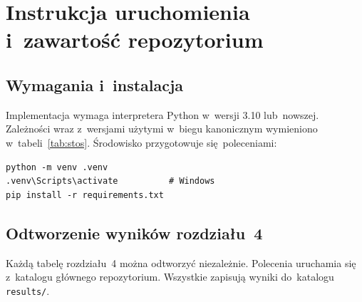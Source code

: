 \documentclass[polish,master,a4paper,oneside]{ppfcmthesis}
\renewcommand{\_}{\origtextunderscore\ifmmode\else\allowbreak\fi}
\begin{document}
{\raggedright\sloppy\small}

\appendix

\chapter{Instrukcja uruchomienia i~zawartość repozytorium}
\label{dod:uruchomienie}

\section{Wymagania i~instalacja}

Implementacja wymaga interpretera Python w~wersji 3.10 lub~nowszej.
Zależności wraz z~wersjami użytymi w~biegu kanonicznym wymieniono
w~tabeli~\ref{tab:stos}. Środowisko przygotowuje się~poleceniami:

\begin{lstlisting}[numbers=none,language={}]
python -m venv .venv
.venv\Scripts\activate          # Windows
pip install -r requirements.txt
\end{lstlisting}

\section{Odtworzenie wyników rozdziału~4}

Każdą tabelę rozdziału~4 można odtworzyć niezależnie. Polecenia uruchamia się
z~katalogu głównego repozytorium. Wszystkie zapisują wyniki do~katalogu
\texttt{results/}.
\end{document}

